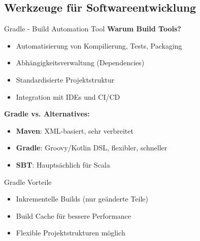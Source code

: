 \subsection{Werkzeuge für Softwareentwicklung}

\begin{frame}{Gradle - Build Automation Tool}
  \textbf{Warum Build Tools?}
  \begin{itemize}
    \item Automatisierung von Kompilierung, Tests, Packaging
    \item Abhängigkeitsverwaltung (Dependencies)
    \item Standardisierte Projektstruktur
    \item Integration mit IDEs und CI/CD
  \end{itemize}

  \textbf{Gradle vs. Alternatives:}
  \begin{itemize}
    \item \textbf{Maven}: XML-basiert, sehr verbreitet
    \item \textbf{Gradle}: Groovy/Kotlin DSL, flexibler, schneller
    \item \textbf{SBT}: Hauptsächlich für Scala
  \end{itemize}

  \begin{exampleblock}{Gradle Vorteile}
    \begin{itemize}
      \item Inkrementelle Builds (nur geänderte Teile)
      \item Build Cache für bessere Performance
      \item Flexible Projektstrukturen möglich
    \end{itemize}
  \end{exampleblock}
\end{frame}

